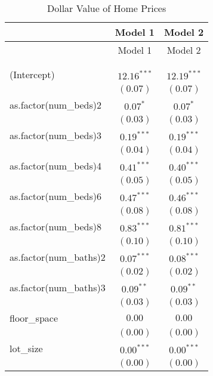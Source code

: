 
\begin{center}
\begin{longtable}{l c c}
\hline
 & Model 1 & Model 2 \\
\hline
\endfirsthead
\hline
 & Model 1 & Model 2 \\
\hline
\endhead
\hline
\endfoot
\hline
\multicolumn{3}{l}{\scriptsize{$^{***}p<0.001$; $^{**}p<0.01$; $^{*}p<0.05$}}\\
\caption{Dollar Value of Home Prices}
\label{tab:cat.transit}
\endlastfoot \\
(Intercept)                & $12.16^{***}$ & $12.19^{***}$ \\
                           & $(0.07)$      & $(0.07)$      \\
as.factor(num\_beds)2      & $0.07^{*}$    & $0.07^{*}$    \\
                           & $(0.03)$      & $(0.03)$      \\
as.factor(num\_beds)3      & $0.19^{***}$  & $0.19^{***}$  \\
                           & $(0.04)$      & $(0.04)$      \\
as.factor(num\_beds)4      & $0.41^{***}$  & $0.40^{***}$  \\
                           & $(0.05)$      & $(0.05)$      \\
as.factor(num\_beds)6      & $0.47^{***}$  & $0.46^{***}$  \\
                           & $(0.08)$      & $(0.08)$      \\
as.factor(num\_beds)8      & $0.83^{***}$  & $0.81^{***}$  \\
                           & $(0.10)$      & $(0.10)$      \\
as.factor(num\_baths)2     & $0.07^{***}$  & $0.08^{***}$  \\
                           & $(0.02)$      & $(0.02)$      \\
as.factor(num\_baths)3     & $0.09^{**}$   & $0.09^{**}$   \\
                           & $(0.03)$      & $(0.03)$      \\
floor\_space               & $0.00$        & $0.00$        \\
                           & $(0.00)$      & $(0.00)$      \\
lot\_size                  & $0.00^{***}$  & $0.00^{***}$  \\
                           & $(0.00)$      & $(0.00)$      \\

\end{longtable}
\end{center}
